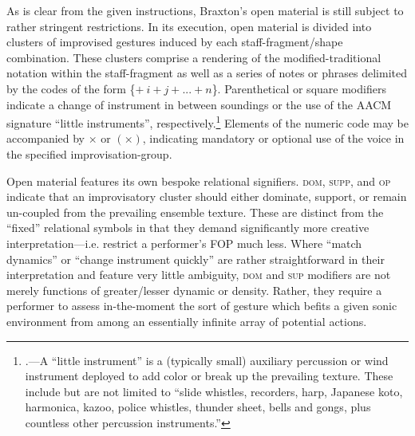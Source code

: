 
        As is clear from the given instructions, Braxton's open material is still subject to rather stringent restrictions. In its execution, open material is divided into clusters of improvised gestures induced by each staff-fragment/shape combination. These clusters comprise a rendering of the modified-traditional notation within the staff-fragment as well as a series of notes or phrases delimited by the codes of the form \{$+\:i + j +... + n$\}. Parenthetical or square modifiers indicate a change of instrument in between soundings or the use of the AACM signature ``little instruments'', respectively.\footnote{\autocite[170]{Jost_1994}.---A ``little instrument'' is a (typically small) auxiliary percussion or wind instrument deployed to add color or break up the prevailing texture. These include but are not limited to ``slide whistles, recorders, harp, Japanese koto, harmonica, kazoo, police whistles, thunder sheet, bells and gongs, plus countless other percussion instruments.''} Elements of the numeric code may be accompanied by $\times$ or $(\times)$, indicating mandatory or optional use of the voice in the specified improvisation-group.
    
        Open material features its own bespoke relational signifiers. \textsc{dom}, \textsc{supp}, and \textsc{op} indicate that an improvisatory cluster should either dominate, support, or remain un-coupled from the prevailing ensemble texture. These are distinct from the ``fixed'' relational symbols in that they demand significantly more creative interpretation---i.e. restrict a performer's FOP much less. Where ``match dynamics'' or ``change instrument quickly'' are rather straightforward in their interpretation and feature very little ambiguity, \textsc{dom} and \textsc{sup} modifiers are not merely functions of greater/lesser dynamic or density. Rather, they require a performer to assess in-the-moment the sort of gesture which befits a given sonic environment from among an essentially infinite array of potential actions.


